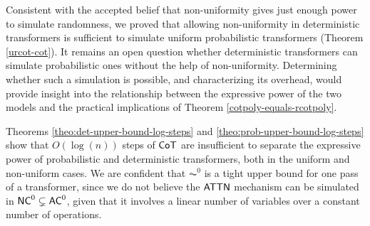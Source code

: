 Consistent with the accepted belief that non-uniformity gives just enough power to simulate randomness, we proved that allowing non-uniformity in deterministic transformers is sufficient to simulate uniform probabilistic transformers (Theorem \ref{urcot-cot}).
It remains an open question whether deterministic transformers can simulate probabilistic ones without the help of non-uniformity.
Determining whether such a simulation is possible, and characterizing its overhead, would provide insight into the relationship between the expressive power of the two models and the practical implications of Theorem \ref{cotpoly-equals-rcotpoly}.

\smallskip

Theorems \ref{theo:det-upper-bound-log-steps} and \ref{theo:prob-upper-bound-log-steps} show that $O(\log(n))$ steps of $\mathsf{CoT}$ are insufficient to separate the expressive power of probabilistic and deterministic transformers, both in the uniform and non-uniform cases.
We are confident that $\AC^0$ is a tight upper bound for one pass of a transformer, since we do not believe the $\mathsf{ATTN}$ mechanism can be simulated in $\mathsf{NC}^0 \subsetneq \mathsf{AC}^0$, given that it involves a linear number of variables over a constant number of operations.